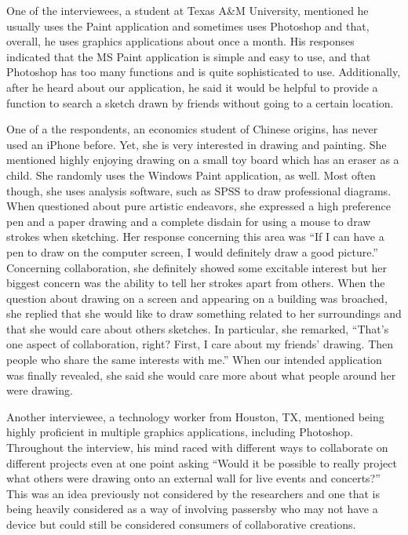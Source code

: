 \documentclass{chi2009}
\begin{document}
One of the interviewees, a student at Texas A\&M University, mentioned he
usually uses the Paint application and sometimes uses Photoshop and that,
overall, he uses graphics applications about once a month.  His responses
indicated that the MS Paint application is simple and easy to use, and that
Photoshop has too many functions and is quite sophisticated to use.
Additionally, after he heard about our application, he said it would be helpful
to provide a function to search a sketch drawn by friends without going to a
certain location.

One of a the respondents, an economics student of Chinese origins, has never used an
iPhone before.  Yet, she is very interested in drawing and painting.  She
mentioned highly enjoying drawing on a small toy board which has an eraser as
a child.  She randomly uses the Windows Paint application, as well.  Most often
though, she uses analysis software, such as SPSS to draw professional diagrams.
When questioned about pure artistic endeavors, she expressed a high preference
pen and a paper drawing and a complete disdain for using a mouse to draw strokes
when sketching. Her response concerning this area was ``If I can have a pen to
draw on the computer screen, I would definitely draw a good picture.''
Concerning collaboration, she definitely showed some excitable interest but her
biggest concern was the ability to tell her strokes apart from others.   When
the question about drawing on a screen and appearing on a building was
broached, she replied that she would like to draw something related to her
surroundings and that she would care about others sketches.  In particular, she
remarked, ``That's one aspect of collaboration, right? First, I care about my
friends' drawing. Then people who share the same interests with me.''
When our intended application was finally revealed, she said she would care
more about what people around her were drawing.

Another interviewee, a technology worker from Houston, TX, mentioned being
highly proficient in multiple graphics applications, including Photoshop.
Throughout the interview, his mind raced with different ways to collaborate on
different projects even at one point asking ``Would it be possible to really
project what others were drawing onto an external wall for live events and
concerts?''  This was an idea previously not considered by the researchers and
one that is being heavily considered as a way of involving passersby who may
not have a device but could still be considered consumers of collaborative
creations.
\end{document}
